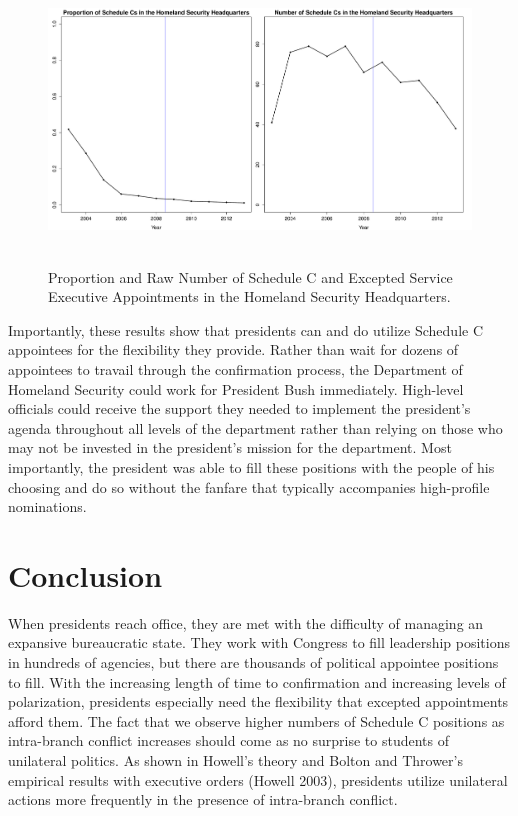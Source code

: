 \documentclass[12pt]{article}
\begin{document}
\begin{figure}[!h]
\begin{center}
\includegraphics[height=3in,width=6in]{DHSProportionRawNumber.pdf}
\caption{Proportion and Raw Number of Schedule C and Excepted Service Executive Appointments in the Homeland Security Headquarters.}
\end{center}
\end{figure}

Importantly, these results show that presidents can and do utilize Schedule C appointees for the flexibility they provide. Rather than wait for dozens of appointees to travail through the confirmation process, the Department of Homeland Security could work for President Bush immediately. High-level officials could receive the support they needed to implement the president's agenda throughout all levels of the department rather than relying on those who may not be invested in the president's mission for the department. Most importantly, the president was able to fill these positions with the people of his choosing and do so without the fanfare that typically accompanies high-profile nominations. 

\section*{Conclusion}	
When presidents reach office, they are met with the difficulty of managing an expansive bureaucratic state. They work with Congress to fill leadership positions in hundreds of agencies, but there are thousands of political appointee positions to fill. With the increasing length of time to confirmation and increasing levels of polarization, presidents especially need the flexibility that excepted appointments afford them. The fact that we observe higher numbers of Schedule C positions as intra-branch conflict increases should come as no surprise to students of unilateral politics. As shown in Howell's theory and Bolton and Thrower's empirical results with executive orders (Howell 2003), presidents utilize unilateral actions more frequently in the presence of intra-branch conflict. 
\end{document}
